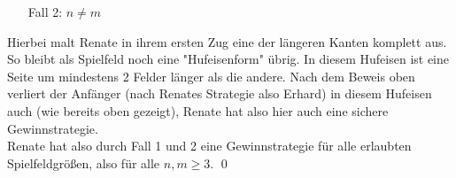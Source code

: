 \documentclass[12pt,a4paper,oneside]{article}
\begin{document}
\begin{itemize}
	\item[Fall 2:] $n\neq m$
\end{itemize}

Hierbei malt Renate in ihrem ersten Zug eine der längeren Kanten komplett aus. So bleibt als Spielfeld noch eine "Hufeisenform" übrig. In diesem Hufeisen ist eine Seite um mindestens 2 Felder länger als die andere. Nach dem Beweis oben verliert der Anfänger (nach Renates Strategie also Erhard) in diesem Hufeisen auch (wie bereits oben gezeigt), Renate hat also hier auch eine sichere Gewinnstrategie.
\\[10pt]
Renate hat also durch Fall 1 und 2 eine Gewinnstrategie für alle erlaubten Spielfeldgrößen, also für alle $n, m \geq 3$. \qed
\end{document}
